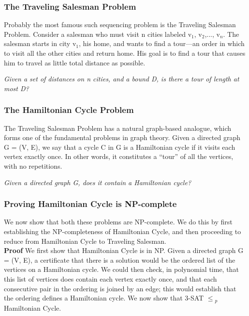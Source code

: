 \documentclass{article}
\begin{document}
\subsubsection{The Traveling Salesman Problem}
Probably the most famous such sequencing problem is the Traveling Salesman Problem. Consider a salesman who must visit n cities labeled v$_1$, v$_2$,..., v$_n$. The salesman starts in city v$_1$, his home, and wants to find a tour—an order in which to visit all the other cities and return home. His goal is to find a tour that causes him to travel as little total distance as possible.

\begin{center}
    \emph{Given a set of distances on n cities, and a bound D, is there a tour of length at most D?}
\end{center}

\subsubsection{The Hamiltonian Cycle Problem}
The Traveling Salesman Problem has a natural graph-based analogue, which forms one of the fundamental problems in graph theory. Given a directed graph G = (V, E), we say that a cycle C in G is a Hamiltonian cycle if it visits each vertex exactly once. In other words, it constitutes a “tour” of all the vertices, with no repetitions.

\begin{center}
    \emph{Given a directed graph G, does it contain a Hamiltonian cycle?}
\end{center}

\subsubsection{Proving Hamiltonian Cycle is NP-complete}
We now show that both these problems are NP-complete. We do this by first establishing the NP-completeness of Hamiltonian Cycle, and then proceeding to reduce from Hamiltonian Cycle to Traveling Salesman.\\

\textbf{Proof} We first show that Hamiltonian Cycle is in NP. Given a directed graph G = (V, E), a certificate that there is a solution would be the ordered list of the vertices on a Hamiltonian cycle. We could then check, in polynomial time, that this list of vertices does contain each vertex exactly once, and that each consecutive pair in the ordering is joined by an edge; this would establish that the ordering defines a Hamiltonian cycle. We now show that 3-SAT $\le$$_p$ Hamiltonian Cycle.\\
\end{document}
